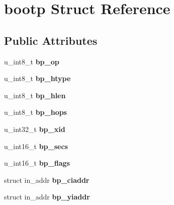 \hypertarget{structbootp}{
\section{bootp Struct Reference}
\label{structbootp}
}
\subsection*{Public Attributes}
\begin{DoxyCompactItemize}
\item 
\hypertarget{structbootp_ab430ccfeabb8499171a16bcf3f6e02fb}{
u\_\-int8\_\-t {\bfseries bp\_\-op}}
\label{structbootp_ab430ccfeabb8499171a16bcf3f6e02fb}

\item 
\hypertarget{structbootp_aba379200227aefecb44d3d405be2b16a}{
u\_\-int8\_\-t {\bfseries bp\_\-htype}}
\label{structbootp_aba379200227aefecb44d3d405be2b16a}

\item 
\hypertarget{structbootp_a7e45ae7fd57d06e7c963d3cc1799d90e}{
u\_\-int8\_\-t {\bfseries bp\_\-hlen}}
\label{structbootp_a7e45ae7fd57d06e7c963d3cc1799d90e}

\item 
\hypertarget{structbootp_a4ac01da55470038904537d84d52fe577}{
u\_\-int8\_\-t {\bfseries bp\_\-hops}}
\label{structbootp_a4ac01da55470038904537d84d52fe577}

\item 
\hypertarget{structbootp_aeaa910ed4dd364f8a78038670479a3e8}{
u\_\-int32\_\-t {\bfseries bp\_\-xid}}
\label{structbootp_aeaa910ed4dd364f8a78038670479a3e8}

\item 
\hypertarget{structbootp_abe3152a5e9cd1b680abd5023b814793d}{
u\_\-int16\_\-t {\bfseries bp\_\-secs}}
\label{structbootp_abe3152a5e9cd1b680abd5023b814793d}

\item 
\hypertarget{structbootp_ae603da0595ab207bf688460b3a4caf14}{
u\_\-int16\_\-t {\bfseries bp\_\-flags}}
\label{structbootp_ae603da0595ab207bf688460b3a4caf14}

\item 
\hypertarget{structbootp_a3694267fcc7da6528087f532919ee88f}{
struct in\_\-addr {\bfseries bp\_\-ciaddr}}
\label{structbootp_a3694267fcc7da6528087f532919ee88f}

\item 
\hypertarget{structbootp_a23c6d746fe7b838cc85edf7918de8964}{
struct in\_\-addr {\bfseries bp\_\-yiaddr}}
\label{structbootp_a23c6d746fe7b838cc85edf7918de8964}


\end{DoxyCompactItemize}
